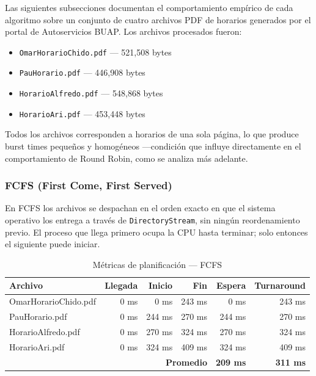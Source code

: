Las siguientes subsecciones documentan el comportamiento empírico de cada algoritmo
sobre un conjunto de cuatro archivos PDF de horarios generados por el portal de
Autoservicios BUAP. Los archivos procesados fueron:

\begin{itemize}
    \item \texttt{OmarHorarioChido.pdf} — 521{,}508 bytes
    \item \texttt{PauHorario.pdf} — 446{,}908 bytes
    \item \texttt{HorarioAlfredo.pdf} — 548{,}868 bytes
    \item \texttt{HorarioAri.pdf} — 453{,}448 bytes
\end{itemize}

Todos los archivos corresponden a horarios de una sola página, lo que produce
burst times pequeños y homogéneos —condición que influye directamente en el
comportamiento de Round Robin, como se analiza más adelante.

\subsubsection{FCFS (First Come, First Served)}

En FCFS los archivos se despachan en el orden exacto en que el sistema operativo
los entrega a través de \texttt{DirectoryStream}, sin ningún reordenamiento previo.
El proceso que llega primero ocupa la CPU hasta terminar; solo entonces el siguiente
puede iniciar.

\begin{table}[H]
\centering
\caption{Métricas de planificación — FCFS}
\label{tab:fcfs-metricas}
\begin{tabular}{|l|r|r|r|r|r|}
\hline
\textbf{Archivo} & \textbf{Llegada} & \textbf{Inicio} & \textbf{Fin} & \textbf{Espera} & \textbf{Turnaround} \\
\hline
OmarHorarioChido.pdf &   0 ms &   0 ms & 243 ms &   0 ms & 243 ms \\
PauHorario.pdf       &   0 ms & 244 ms & 270 ms & 244 ms & 270 ms \\
HorarioAlfredo.pdf   &   0 ms & 270 ms & 324 ms & 270 ms & 324 ms \\
HorarioAri.pdf       &   0 ms & 324 ms & 409 ms & 324 ms & 409 ms \\
\hline
\multicolumn{4}{|r|}{\textbf{Promedio}} & \textbf{209 ms} & \textbf{311 ms} \\
\hline
\end{tabular}
\end{table}

